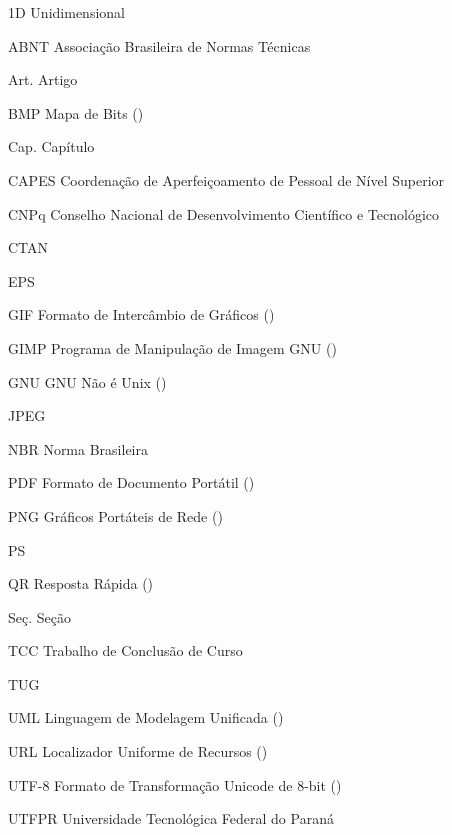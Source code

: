 
\begin{AcronymsList}%
\item[1D] Unidimensional
\item[ABNT] Associação Brasileira de Normas Técnicas
\item[Art.] Artigo
\item[BMP] Mapa de Bits ()
\item[Cap.] Capítulo
\item[CAPES] Coordenação de Aperfeiçoamento de Pessoal de Nível Superior
\item[CNPq] Conselho Nacional de Desenvolvimento Científico e Tecnológico
\item[CTAN] 
\item[EPS] 
\item[GIF] Formato de Intercâmbio de Gráficos ()
\item[GIMP] Programa de Manipulação de Imagem GNU ()
\item[GNU] GNU Não é Unix ()
\item[JPEG] 
\item[NBR] Norma Brasileira
\item[PDF] Formato de Documento Portátil ()
\item[PNG] Gráficos Portáteis de Rede ()
\item[PS] 
\item[QR] Resposta Rápida ()
\item[Seç.] Seção
\item[TCC] Trabalho de Conclusão de Curso
\item[TUG] 
\item[UML] Linguagem de Modelagem Unificada ()
\item[URL] Localizador Uniforme de Recursos ()
\item[UTF-8] Formato de Transformação Unicode de 8-bit ()
\item[UTFPR] Universidade Tecnológica Federal do Paraná
\end{AcronymsList}
